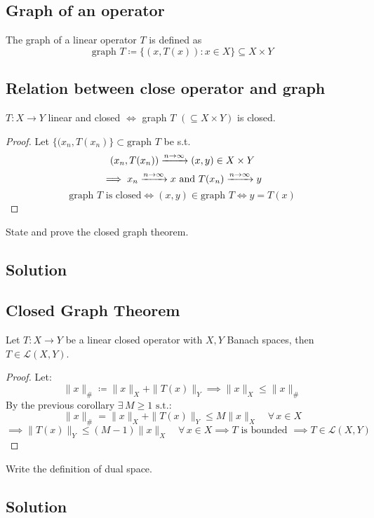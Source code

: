 \subsection{Graph of an operator}
The graph of a linear operator $T$ is defined as
\[\mbox{graph }T\coloneqq\{(x,T(x)):x\in X\}\subseteq X\times Y\]

\subsection{Relation between close operator and graph}$T:X\rightarrow Y$ linear and closed $\iff$ graph $T\,\,(\subseteq X\times Y)$ is closed.
\begin{proof}
    Let $\{(x_n,T(x_n)\}\subset\mbox{graph }T$ be s.t.
    \[(x_n,T(x_n))\xrightarrow{n\to\infty}(x,y)\in X\times Y\]
    \[\implies x_n\xrightarrow{n\to\infty}x\text{ and } T(x_n)\xrightarrow[]{n\to\infty}y\]
    \[ \text{graph $T$ is closed} \iff (x,y)\in \text{graph } T\iff y=T(x)\]
\end{proof}


\question
State and prove the closed graph theorem.

\subsection*{Solution}

\subsection{Closed Graph Theorem} 
Let $T:X\rightarrow Y$ be a linear closed operator with $X,Y$ Banach spaces, then $T\in\mathcal{L}(X,Y)$.
\begin{proof}
Let:
    \[\|x\|_\#\coloneqq\|x\|_X+\|T(x)\|_Y \implies \|x\|_X\leq\|x\|_\#\]
    By the previous corollary $\exists\,M\geq1 \text{ s.t.}$:\[
    \|x\|_\#=\|x\|_X+\|T(x)\|_Y\leq M \|x\|_X\quad\forall\,x\in X
    \]
    \[\implies \|T(x)\|_Y\leq (M-1)\|x\|_X\quad\forall\,x\in X\implies T \text{ is bounded } \implies T\in\mathcal{L}(X,Y)\]
\end{proof}


\question
Write the definition of dual space.

\subsection*{Solution}

